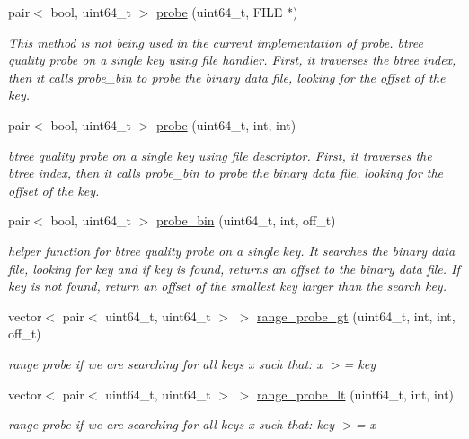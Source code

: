 \begin{DoxyCompactItemize}
\item 
pair$<$ bool, uint64\+\_\+t $>$ \hyperlink{class_b_tree_index_a768090c78f62663632baa93b3786552f}{probe} (uint64\+\_\+t, F\+I\+L\+E $\ast$)
\begin{DoxyCompactList}\small\item\em This method is not being used in the current implementation of probe. btree quality probe on a single key using file handler. First, it traverses the btree index, then it calls probe\+\_\+bin to probe the binary data file, looking for the offset of the key. \end{DoxyCompactList}\item 
pair$<$ bool, uint64\+\_\+t $>$ \hyperlink{class_b_tree_index_a5f7c70180b49b73c02352ba1135a91f7}{probe} (uint64\+\_\+t, int, int)
\begin{DoxyCompactList}\small\item\em btree quality probe on a single key using file descriptor. First, it traverses the btree index, then it calls probe\+\_\+bin to probe the binary data file, looking for the offset of the key. \end{DoxyCompactList}\item 
pair$<$ bool, uint64\+\_\+t $>$ \hyperlink{class_b_tree_index_a8a5d7a705ae4eb777695d819b88c08a4}{probe\+\_\+bin} (uint64\+\_\+t, int, off\+\_\+t)
\begin{DoxyCompactList}\small\item\em helper function for btree quality probe on a single key. It searches the binary data file, looking for key and if key is found, returns an offset to the binary data file. If key is not found, return an offset of the smallest key larger than the search key. \end{DoxyCompactList}\item 
vector$<$ pair$<$ uint64\+\_\+t, uint64\+\_\+t $>$ $>$ \hyperlink{class_b_tree_index_a212f6138db459618a7dd7e2ccc813cc3}{range\+\_\+probe\+\_\+gt} (uint64\+\_\+t, int, int, off\+\_\+t)
\begin{DoxyCompactList}\small\item\em range probe if we are searching for all keys x such that\+: x $>$= key \end{DoxyCompactList}\item 
vector$<$ pair$<$ uint64\+\_\+t, uint64\+\_\+t $>$ $>$ \hyperlink{class_b_tree_index_a648938da25539265a0c938e989076e06}{range\+\_\+probe\+\_\+lt} (uint64\+\_\+t, int, int)
\begin{DoxyCompactList}\small\item\em range probe if we are searching for all keys x such that\+: key $>$= x \end{DoxyCompactList}\item 

\end{DoxyCompactItemize}
